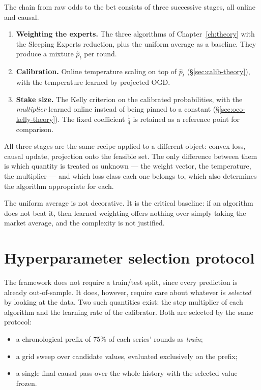 \documentclass[12pt,a4paper,oneside]{report}
\renewcommand{\_}{\oldunderscore\allowbreak}
\theoremstyle{definition}
\theoremstyle{plain}
\theoremstyle{remark}
\begin{document}
The chain from raw odds to the bet consists of three successive stages, all online and causal.

\begin{enumerate}
  \item \textbf{Weighting the experts.} The three algorithms of Chapter~\ref{ch:theory} with the
        Sleeping Experts reduction, plus the uniform average as a baseline. They produce a
        mixture $\hat{p}_t$ per round.
  \item \textbf{Calibration.} Online temperature scaling on top of $\hat{p}_t$
        (\S\ref{sec:calib-theory}), with the temperature learned by projected OGD.
  \item \textbf{Stake size.} The Kelly criterion on the calibrated probabilities, with the
        \emph{multiplier} learned online instead of being pinned to a constant
        (\S\ref{sec:oco-kelly-theory}). The fixed coefficient $\tfrac14$ is retained as a
        reference point for comparison.
\end{enumerate}

All three stages are the same recipe applied to a different object: convex loss, causal update,
projection onto the feasible set. The only difference between them is which quantity is treated
as unknown --- the weight vector, the temperature, the multiplier --- and which loss class each
one belongs to, which also determines the algorithm appropriate for each.

The uniform average is not decorative. It is the critical baseline: if an algorithm does not beat
it, then learned weighting offers nothing over simply taking the market average, and the
complexity is not justified.

\section{Hyperparameter selection protocol}
\label{sec:protocol}

The framework does not require a train/test split, since every prediction is already
out-of-sample. It does, however, require care about whatever is \emph{selected} by looking at the
data. Two such quantities exist: the step multiplier of each algorithm and the learning rate of
the calibrator. Both are selected by the same protocol:

\begin{itemize}
  \item a chronological prefix of 75\% of each series' rounds as \emph{train};
  \item a grid sweep over candidate values, evaluated exclusively on the prefix;
  \item a single final causal pass over the whole history with the selected value frozen.
\end{itemize}
\end{document}
